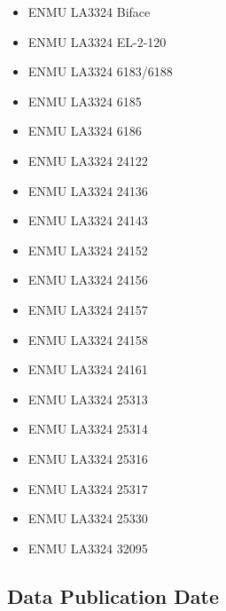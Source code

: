 \documentclass[preprint,12pt]{elsarticle}
\begin{document}
\begin{itemize}

\item ENMU LA3324 Biface \citep{Selden:Z1}

\item ENMU LA3324 EL-2-120 \citep{Selden:Z2}

\item ENMU LA3324 6183/6188 \citep{Selden:Z3}

\item ENMU LA3324 6185 \citep{Selden:Z4}

\item ENMU LA3324 6186 \citep{Selden:Z5}

\item ENMU LA3324 24122 \citep{Selden:Z6}

\item ENMU LA3324 24136 \citep{Selden:Z7}

\item ENMU LA3324 24143 \citep{Selden:Z8}

\item ENMU LA3324 24152 \citep{Selden:Z9}

\item ENMU LA3324 24156 \citep{Selden:Z10}

\item ENMU LA3324 24157 \citep{Selden:Z11}

\item ENMU LA3324 24158 \citep{Selden:Z12}

\item ENMU LA3324 24161 \citep{Selden:Z13}

\item ENMU LA3324 25313 \citep{Selden:Z14}

\item ENMU LA3324 25314 \citep{Selden:Z15}

\item ENMU LA3324 25316 \citep{Selden:Z16}

\item ENMU LA3324 25317 \citep{Selden:Z17}

\item ENMU LA3324 25330 \citep{Selden:Z18}

\item ENMU LA3324 32095 \citep{Selden:Z19}

\end{itemize}

\subsection{Data Publication Date}
\end{document}
